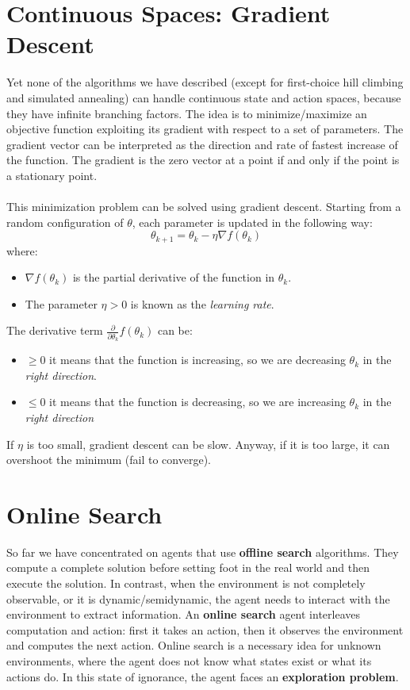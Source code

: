 \section{Continuous Spaces: Gradient Descent}
Yet none of the algorithms we have described (except for first-choice hill climbing and simulated annealing) can handle continuous state and action spaces, because they have infinite branching factors.\newline\newline
The idea is to minimize/maximize an objective function exploiting its gradient with respect to a set of parameters. The gradient vector can be interpreted as the direction and rate of fastest increase of the function. The gradient is the zero vector at a point if and only if the point is a stationary point.\\\\
This minimization problem can be solved using gradient descent. Starting from a random configuration of $\theta$, each parameter is updated in the following way:
\[\theta_{k+1} = \theta_{k} - \eta \nabla f(\theta_{k})\]
where:
\begin{itemize}
    \item $\nabla f(\theta_{k})$ is the partial derivative of the function in $\theta_{k}$.
    \item The parameter $\eta > 0$ is known as the \textit{learning rate}. 
\end{itemize}
The derivative term $\frac{\partial}{\partial \theta_{k}}f(\theta_{k})$ can be:
\begin{itemize}
    \item $\geq 0$ it means that the function is increasing, so we are decreasing $\theta_{k}$ in the \textit{right direction}.
    \item $\leq 0$ it means that the function is decreasing, so we are increasing $\theta_{k}$ in the \textit{right direction}
\end{itemize}
If $\eta$ is too small, gradient descent can be slow. Anyway, if it is too large, it can overshoot the minimum (fail to converge). 

\section{Online Search}
So far we have concentrated on agents that use \textbf{offline search} algorithms. They compute a complete solution before setting foot in the real world and then execute the solution. In contrast, when the environment is not completely observable, or it is dynamic/semidynamic, the agent needs to interact with the environment to extract information. An \textbf{online search} agent interleaves computation and action: first it takes an action, then it observes the environment and computes the next action. Online search is a necessary idea for unknown environments, where the agent does not know what states exist or what its actions do. In this state of ignorance, the agent faces an \textbf{exploration problem}.\newline\newline

